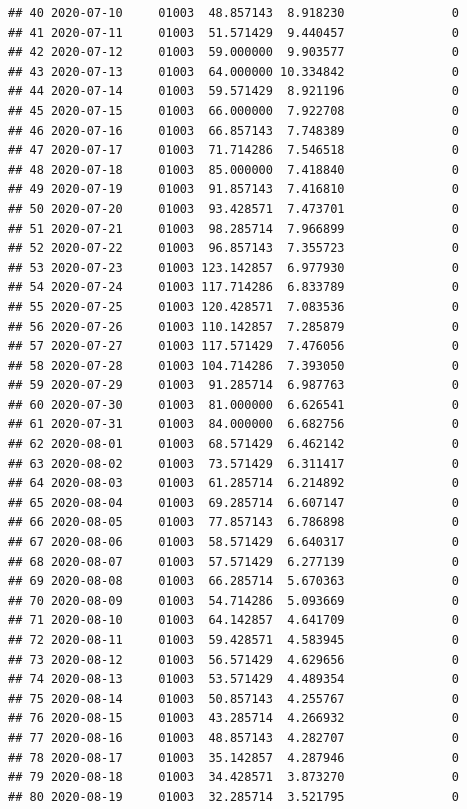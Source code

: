\documentclass[]{article}
\begin{document}
\begin{verbatim}
## 40 2020-07-10     01003  48.857143  8.918230               0
## 41 2020-07-11     01003  51.571429  9.440457               0
## 42 2020-07-12     01003  59.000000  9.903577               0
## 43 2020-07-13     01003  64.000000 10.334842               0
## 44 2020-07-14     01003  59.571429  8.921196               0
## 45 2020-07-15     01003  66.000000  7.922708               0
## 46 2020-07-16     01003  66.857143  7.748389               0
## 47 2020-07-17     01003  71.714286  7.546518               0
## 48 2020-07-18     01003  85.000000  7.418840               0
## 49 2020-07-19     01003  91.857143  7.416810               0
## 50 2020-07-20     01003  93.428571  7.473701               0
## 51 2020-07-21     01003  98.285714  7.966899               0
## 52 2020-07-22     01003  96.857143  7.355723               0
## 53 2020-07-23     01003 123.142857  6.977930               0
## 54 2020-07-24     01003 117.714286  6.833789               0
## 55 2020-07-25     01003 120.428571  7.083536               0
## 56 2020-07-26     01003 110.142857  7.285879               0
## 57 2020-07-27     01003 117.571429  7.476056               0
## 58 2020-07-28     01003 104.714286  7.393050               0
## 59 2020-07-29     01003  91.285714  6.987763               0
## 60 2020-07-30     01003  81.000000  6.626541               0
## 61 2020-07-31     01003  84.000000  6.682756               0
## 62 2020-08-01     01003  68.571429  6.462142               0
## 63 2020-08-02     01003  73.571429  6.311417               0
## 64 2020-08-03     01003  61.285714  6.214892               0
## 65 2020-08-04     01003  69.285714  6.607147               0
## 66 2020-08-05     01003  77.857143  6.786898               0
## 67 2020-08-06     01003  58.571429  6.640317               0
## 68 2020-08-07     01003  57.571429  6.277139               0
## 69 2020-08-08     01003  66.285714  5.670363               0
## 70 2020-08-09     01003  54.714286  5.093669               0
## 71 2020-08-10     01003  64.142857  4.641709               0
## 72 2020-08-11     01003  59.428571  4.583945               0
## 73 2020-08-12     01003  56.571429  4.629656               0
## 74 2020-08-13     01003  53.571429  4.489354               0
## 75 2020-08-14     01003  50.857143  4.255767               0
## 76 2020-08-15     01003  43.285714  4.266932               0
## 77 2020-08-16     01003  48.857143  4.282707               0
## 78 2020-08-17     01003  35.142857  4.287946               0
## 79 2020-08-18     01003  34.428571  3.873270               0
## 80 2020-08-19     01003  32.285714  3.521795               0

\end{verbatim}
\end{document}

